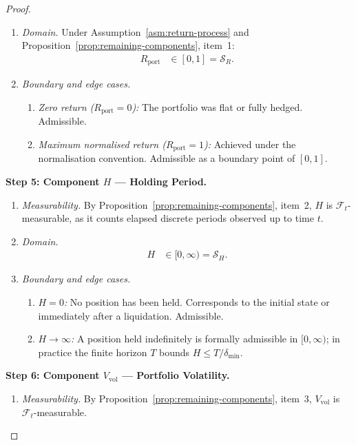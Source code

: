 \documentclass[12pt,openany]{book}
\newcommand{\calF}{\mathcal{F}}
\numberwithin{equation}{chapter}
\theoremstyle{plain}
\theoremstyle{definition}
\theoremstyle{remark}
\numberwithin{equation}{chapter}
\theoremstyle{plain}
\begin{document}
\begin{proof}
\begin{enumerate}
  \item \emph{Domain.}
    Under Assumption~\ref{asm:return-process} and
    Proposition~\ref{prop:remaining-components}, item~1:
    \begin{align}
      R_{\mathrm{port}}
        &\in [0, 1]
         = \mathcal{S}_R.
    \end{align}

  \item \emph{Boundary and edge cases.}
    \begin{enumerate}
      \item \emph{Zero return ($R_{\mathrm{port}} = 0$):}
        The portfolio was flat or fully hedged.  Admissible.
      \item \emph{Maximum normalised return
        ($R_{\mathrm{port}} = 1$):}
        Achieved under the normalisation convention.
        Admissible as a boundary point of $[0,1]$.
    \end{enumerate}
\end{enumerate}

\medskip
\noindent\textbf{Step 5: Component $H$ — Holding Period.}
\begin{enumerate}
  \item \emph{Measurability.}
    By Proposition~\ref{prop:remaining-components}, item~2,
    $H$ is $\calF_t$-measurable, as it counts elapsed
    discrete periods observed up to time $t$.

  \item \emph{Domain.}
    \begin{align}
      H
        &\in [0, \infty)
         = \mathcal{S}_H.
    \end{align}

  \item \emph{Boundary and edge cases.}
    \begin{enumerate}
      \item \emph{$H = 0$:}  No position has been held.
        Corresponds to the initial state or immediately
        after a liquidation.  Admissible.
      \item \emph{$H \to \infty$:}
        A position held indefinitely is formally admissible
        in $[0,\infty)$; in practice the finite horizon $T$
        bounds $H \leq T / \delta_{\min}$.
    \end{enumerate}
\end{enumerate}

\medskip
\noindent\textbf{Step 6: Component $V_{\mathrm{vol}}$ —
Portfolio Volatility.}
\begin{enumerate}
  \item \emph{Measurability.}
    By Proposition~\ref{prop:remaining-components}, item~3,
    $V_{\mathrm{vol}}$ is $\calF_t$-measurable.


\end{enumerate}
\end{proof}
\end{document}
